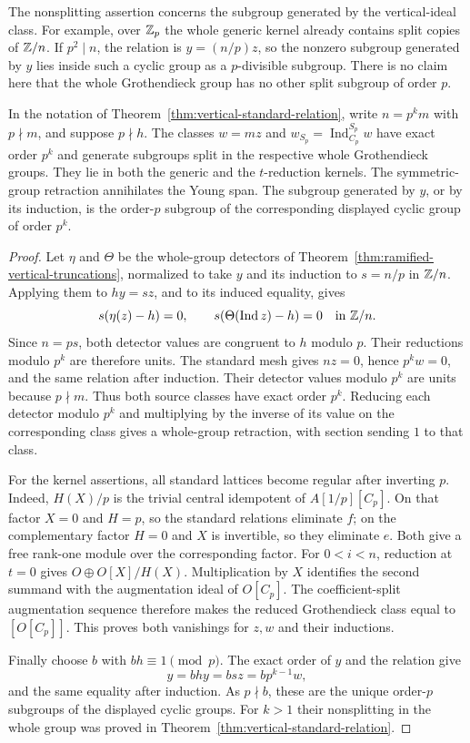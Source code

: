 \begin{remark}
The nonsplitting assertion concerns the subgroup generated by the
vertical-ideal class.  For example, over $\mathbb Z_p$ the whole generic
kernel already contains split copies of $\mathbb Z/n$.  If $p^2\mid n$,
the relation is $y=(n/p)z$, so the nonzero subgroup generated by
$y$ lies inside such a cyclic group as a $p$-divisible subgroup.
There is no claim here that the whole Grothendieck group has no
other split subgroup of order $p$.
\end{remark}

\begin{corollary}\label{cor:vertical-primary-split}
In the notation of Theorem~\ref{thm:vertical-standard-relation}, write
$n=p^k m$ with $p\nmid m$, and suppose $p\nmid h$.
The classes $w=mz$ and $w_{S_p}=\operatorname{Ind}_{C_p}^{S_p}w$
have exact order $p^k$ and generate subgroups split in the respective
whole Grothendieck groups.  They lie in both the generic and the
$t$-reduction kernels.  The symmetric-group retraction annihilates
the Young span.  The subgroup generated by $y$, or by its induction,
is the order-$p$ subgroup of the corresponding displayed cyclic
group of order $p^k$.
\end{corollary}

\begin{proof}
Let $\eta$ and $\Theta$ be the whole-group detectors of
Theorem~\ref{thm:ramified-vertical-truncations}, normalized to
take $y$ and its induction to $s=n/p$ in $\mathbb Z/n$.
Applying them to $hy=sz$, and to its induced equality, gives
\[
 s(\eta(z)-h)=0,\qquad
 s(\Theta(\operatorname{Ind}z)-h)=0\quad\text{in }\mathbb Z/n.
\]
Since $n=ps$, both detector values are congruent to $h$ modulo $p$.
Their reductions modulo $p^k$ are therefore units.  The standard
mesh gives $nz=0$, hence $p^k w=0$, and the same relation after
induction.  Their detector values modulo $p^k$ are units because
$p\nmid m$.  Thus both source classes have exact order $p^k$.
Reducing each detector modulo $p^k$ and multiplying by the inverse
of its value on the corresponding class gives a whole-group
retraction, with section sending $1$ to that class.

For the kernel assertions, all standard lattices become regular
after inverting $p$.  Indeed, $H(X)/p$ is the trivial central
idempotent of $A[1/p][C_p]$.  On that factor $X=0$ and $H=p$,
so the standard relations eliminate $f$; on the complementary
factor $H=0$ and $X$ is invertible, so they eliminate $e$.
Both give a free rank-one module over the corresponding factor.
For $0<i<n$, reduction at $t=0$ gives
$O\oplus O[X]/H(X)$.  Multiplication by $X$ identifies the second
summand with the augmentation ideal of $O[C_p]$.  The
coefficient-split augmentation sequence therefore makes the reduced
Grothendieck class equal to $[O[C_p]]$.  This proves both vanishings
for $z,w$ and their inductions.

Finally choose $b$ with $bh\equiv1\pmod p$.  The exact order of
$y$ and the relation give
\[
 y=bhy=bsz=b p^{k-1}w,
\]
and the same equality after induction.  As $p\nmid b$, these are
the unique order-$p$ subgroups of the displayed cyclic groups.
For $k>1$ their nonsplitting in the whole group was proved in
Theorem~\ref{thm:vertical-standard-relation}.
\end{proof}
